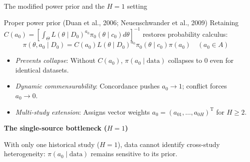 \documentclass[t]{beamer}
\newcommand{\T}{\mathrm{T}}
\begin{document}
\begin{frame}{The modified power prior and the $H=1$ setting}
    \begin{block}{Proper power prior (Duan et al., 2006; Neuenschwander et al., 2009)}
    Retaining $C(a_0) = [ \int_\Theta L(\theta \mid D_0)^{a_0} \pi_0(\theta \mid c_0) d\theta ]^{-1}$ restores probability calculus:
    \begin{equation*}
        \pi(\theta, a_0 \mid D_0) = C(a_0) L(\theta \mid D_0)^{a_0} \pi_0(\theta \mid c_0) \pi(a_0) \quad (a_0 \in A)
    \end{equation*}
    \end{block}

    \begin{itemize}
        \item \emph{Prevents collapse}: Without $C(a_0)$, $\pi(a_0 \mid \text{data})$ collapses to 0 even for identical datasets.
        \item \emph{Dynamic commensurability}: Concordance pushes $a_0 \to 1$; conflict forces $a_0 \to 0$.
        \item \emph{Multi-study extension}: Assigns vector weights $a_0 = (a_{01}, \dots, a_{0H})^\T$ for $H \ge 2$.
    \end{itemize}

    \begin{highlightbox}
        \textbf{\textcolor{MyRed}{\small The single-source bottleneck ($H = 1$)}}\par\vspace{2pt}
        {\footnotesize With only one historical study ($H=1$), data cannot identify cross-study heterogeneity: $\pi(a_0 \mid \text{data})$ remains sensitive to its prior.}
    \end{highlightbox}
\end{frame}
\end{document}
